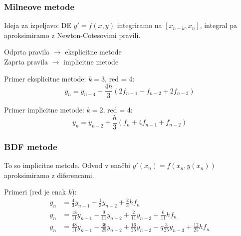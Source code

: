 \begin{multicols}{5}
\subsubsection*{Milneove metode}
Ideja za izpeljavo: DE $y' = f(x,y)$ integriramo na $[x_{n-k}, x_n]$, integral pa aproksimiramo z Newton-Cotesovimi pravili.

Odprta pravila $\rightarrow$ eksplicitne metode \\
Zaprta pravila $\rightarrow$ implicitne metode 

Primer eksplicitne metode: $k = 3$, red = 4:
\[ y_n = y_{n-4} + \frac{4h}{3} (2f_{n-1} - f_{n-2} + 2f_{n-3}) \]

Primer implicitne metode: $k = 2$, red = 4:
\[ y_n = y_{n-2} + \frac{h}{3} (f_{n} + 4f_{n-1} + f_{n-2}) \]

\subsubsection*{BDF metode}
To so implicitne metode. Odvod v enačbi $y'(x_n) = f(x_n, y(x_n))$ aproksimiramo z diferencami.

Primeri (red je enak $k$):
\begin{align*}
    y_n &= \frac{4}{3} y_{n-1} - \frac{1}{3} y_{n-2} + \frac{2}{3}h f_n \\
    y_n &= \frac{18}{11} y_{n-1} - \frac{9}{11} y_{n-2} + \frac{2}{11} y_{n-3} + \frac{6}{11} h f_n \\
    y_n &= \frac{48}{11} y_{n-1} - \frac{36}{25} y_{n-2} + \frac{16}{25} y_{n-3} -q  \frac{3}{25} y_{n-3} + \frac{12}{25} h f_n \\
\end{align*}

\end{multicols}
